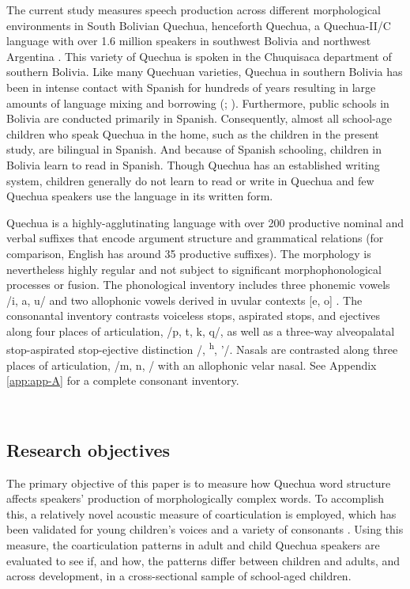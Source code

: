 \documentclass[a4paper,man,floatsintext,natbib,donotrepeattitle, apacite]{apa6}
\begin{document}
The current study measures speech production across different morphological environments in South Bolivian Quechua, henceforth Quechua, a Quechua-II/C language with over 1.6 million speakers in southwest Bolivia and northwest Argentina \citep{toreroDialectosQuechuas1964}. This variety of Quechua is spoken in the Chuquisaca department of southern Bolivia. Like many Quechuan varieties, Quechua in southern Bolivia has been in intense contact with Spanish for hundreds of years resulting in large amounts of language mixing and borrowing (\citealt{muyskenContactsIndigenousLanguages2012}; \citealt{muyskenSpanishAffixesQuechua2012}). Furthermore, public schools in Bolivia are conducted primarily in Spanish. Consequently, almost all school-age children who speak Quechua in the home, such as the children in the present study, are bilingual in Spanish. And because of Spanish schooling, children in Bolivia learn to read in Spanish. Though Quechua has an established writing system, children generally do not learn to read or write in Quechua and few Quechua speakers use the language in its written form.

Quechua is a highly-agglutinating language with over 200 productive nominal and verbal suffixes that encode argument structure and grammatical relations (for comparison, English has around 35 productive suffixes). The morphology is nevertheless highly regular and not subject to significant morphophonological processes or fusion. The phonological inventory includes three phonemic vowels /i, a, u/ and two allophonic vowels derived in uvular contexts [e, o] \citep{gallagherVowelHeightAllophony2016}. The consonantal inventory contrasts voiceless stops, aspirated stops, and ejectives along four places of articulation, /p, t, k, q/, as well as a three-way alveopalatal stop-aspirated stop-ejective distinction /\textteshlig, \textteshlig\textsuperscript{h}, \textteshlig'/. Nasals are contrasted along three places of articulation, /m, n, \textltailn/ with an allophonic velar nasal. See Appendix \ref{app:app-A} for a complete consonant inventory. 

~
~

\subsection{Research objectives}

The primary objective of this paper is to measure how Quechua word structure affects speakers' production of morphologically complex words. To accomplish this, a relatively novel acoustic measure of coarticulation is employed, which has been validated for young children’s voices and a variety of consonants \citep{cychoszSpectralTemporalMeasures2019}. Using this measure, the coarticulation patterns in adult and child Quechua speakers are evaluated to see if, and how, the patterns differ between children and adults, and across development, in a cross-sectional sample of school-aged children. 
\end{document}
